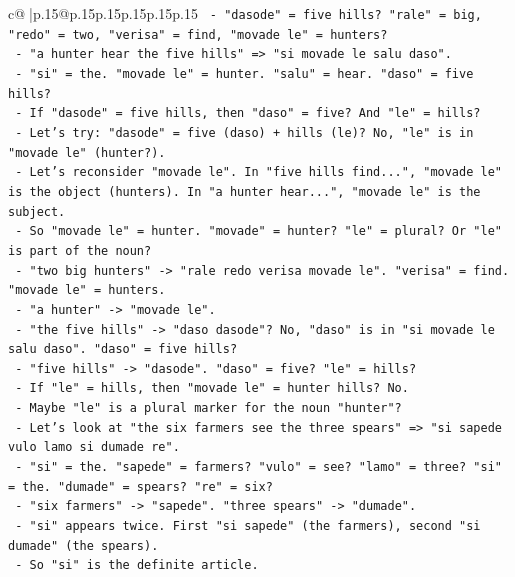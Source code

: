 \documentclass{article}
\begin{document}
{\begin{supertabular}{c@{$\;$}|p{.15\linewidth}@{}p{.15\linewidth}p{.15\linewidth}p{.15\linewidth}p{.15\linewidth}p{.15\linewidth}}
{{{\texttt{              {-} "dasode" = five hills? "rale" = big, "redo" = two, "verisa" = find, "movade le" = hunters?} \\
\texttt{              {-} "a hunter hear the five hills" => "si movade le salu daso".} \\
\texttt{                {-} "si" = the. "movade le" = hunter. "salu" = hear. "daso" = five hills?} \\
\texttt{                {-} If "dasode" = five hills, then "daso" = five? And "le" = hills?} \\
\texttt{                {-} Let's try: "dasode" = five (daso) + hills (le)? No, "le" is in "movade le" (hunter?).} \\
\texttt{                {-} Let's reconsider "movade le". In "five hills find...", "movade le" is the object (hunters). In "a hunter hear...", "movade le" is the subject.} \\
\texttt{                {-} So "movade le" = hunter. "movade" = hunter? "le" = plural? Or "le" is part of the noun?} \\
\texttt{                {-} "two big hunters" {-}> "rale redo verisa movade le". "verisa" = find. "movade le" = hunters.} \\
\texttt{                {-} "a hunter" {-}> "movade le".} \\
\texttt{                {-} "the five hills" {-}> "daso dasode"? No, "daso" is in "si movade le salu daso". "daso" = five hills?} \\
\texttt{                {-} "five hills" {-}> "dasode". "daso" = five? "le" = hills?} \\
\texttt{                {-} If "le" = hills, then "movade le" = hunter hills? No.} \\
\texttt{                {-} Maybe "le" is a plural marker for the noun "hunter"?} \\
\texttt{                {-} Let's look at "the six farmers see the three spears" => "si sapede vulo lamo si dumade re".} \\
\texttt{                  {-} "si" = the. "sapede" = farmers? "vulo" = see? "lamo" = three? "si" = the. "dumade" = spears? "re" = six?} \\
\texttt{                  {-} "six farmers" {-}> "sapede". "three spears" {-}> "dumade".} \\
\texttt{                  {-} "si" appears twice. First "si sapede" (the farmers), second "si dumade" (the spears).} \\
\texttt{                  {-} So "si" is the definite article.} \\
}}}
\end{supertabular}}
\end{document}
